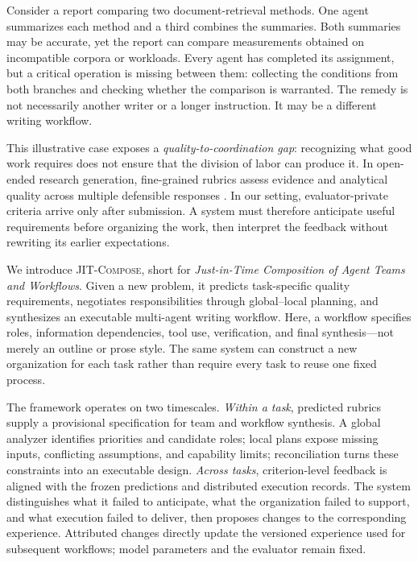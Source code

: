 \documentclass[11pt]{article}
\newcommand{\method}{\mbox{\textsc{JIT-Compose}}}
\begin{document}
Consider a report comparing two document-retrieval methods. One agent summarizes each method and a third combines the summaries. Both summaries may be accurate, yet the report can compare measurements obtained on incompatible corpora or workloads. Every agent has completed its assignment, but a critical operation is missing between them: collecting the conditions from both branches and checking whether the comparison is warranted. The remedy is not necessarily another writer or a longer instruction. It may be a different writing workflow.

This illustrative case exposes a \emph{quality-to-coordination gap}: recognizing what good work requires does not ensure that the division of labor can produce it. In open-ended research generation, fine-grained rubrics assess evidence and analytical quality across multiple defensible responses \citep{sharma2025researchrubrics}. In our setting, evaluator-private criteria arrive only after submission. A system must therefore anticipate useful requirements before organizing the work, then interpret the feedback without rewriting its earlier expectations.



We introduce \method, short for \emph{Just-in-Time Composition of Agent Teams and Workflows}. Given a new problem, it predicts task-specific quality requirements, negotiates responsibilities through global--local planning, and synthesizes an executable multi-agent writing workflow. Here, a workflow specifies roles, information dependencies, tool use, verification, and final synthesis---not merely an outline or prose style. The same system can construct a new organization for each task rather than require every task to reuse one fixed process.

The framework operates on two timescales. \emph{Within a task}, predicted rubrics supply a provisional specification for team and workflow synthesis. A global analyzer identifies priorities and candidate roles; local plans expose missing inputs, conflicting assumptions, and capability limits; reconciliation turns these constraints into an executable design. \emph{Across tasks}, criterion-level feedback is aligned with the frozen predictions and distributed execution records. The system distinguishes what it failed to anticipate, what the organization failed to support, and what execution failed to deliver, then proposes changes to the corresponding experience. Attributed changes directly update the versioned experience used for subsequent workflows; model parameters and the evaluator remain fixed.
\end{document}
